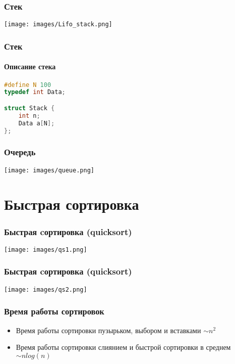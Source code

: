 \documentclass[12pt,pdf,hyperref={unicode}]{beamer}
\begin{document}
\begin{frame}[fragile]
\frametitle{Стек} 
\begin{center}
\texttt{[image: images/Lifo\_stack.png]}
\end{center}
\end{frame}


\begin{frame}[fragile]
\frametitle{Стек} 
\framesubtitle{Описание стека} 

\begin{lstlisting}[language=C++,basicstyle=\ttfamily,keywordstyle=\color{blue}]
#define N 100
typedef int Data;

struct Stack {
    int n;
    Data a[N];
};
\end{lstlisting}
\end{frame}


\begin{frame}[fragile]
\frametitle{Очередь} 
\begin{center}
\texttt{[image: images/queue.png]}
\end{center}
\end{frame}




\section{Быстрая сортировка}

\begin{frame}[fragile]
\frametitle{Быстрая cортировка (quicksort)} 
\begin{center}
\texttt{[image: images/qs1.png]}
\end{center}
\end{frame}

\begin{frame}[fragile]
\frametitle{Быстрая cортировка (quicksort)} 
\begin{center}
\texttt{[image: images/qs2.png]}
\end{center}
\end{frame}


\begin{frame}[fragile]
\frametitle{Время работы сортировок} 
\begin{itemize}
\item Время работы сортировки пузырьком, выбором и вставками $\sim n^2$ \\
\item Время работы сортировки слиянием и быстрой сортировки в среднем $\sim n log(n)$ \\
\end{itemize}
\end{frame}
\end{document}
